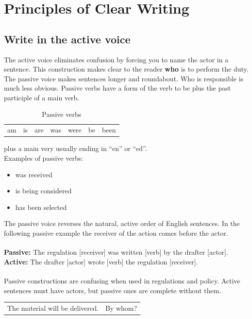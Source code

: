 \documentclass[12pt, letterpaper]{report}
\begin{document}
\begin{linenumbers}
\begin{multicols}{2}
	\end{multicols}
	\chapter{Principles of Clear Writing}
	    \section{Write in the active voice}
	    The active voice eliminates confusion by forcing you to name the actor in a sentence. This construction makes clear to the reader \textbf{who} is to perform the duty.\\
	    The passive voice makes sentences longer and roundabout. Who is responsible is much less obvious. Passive verbs have a form of the verb to be plus the past participle of a main verb.
	    \begin{table}[h]
	        \centering
	        \begin{tabular}{ccccccc}
	             am & is & are & was & were & be & been  \\
	            \end{tabular}
	        \caption{Passive verbs}
	        \label{tab:passverbs}
	    \end{table}
	    plus a main very usually ending in ``en'' or ``ed''.\\
	    Examples of passive verbs:
	    \begin{itemize}
	        \item was received
	        \item is being considered
	        \item has been selected
	    \end{itemize}
	    The passive voice reverses the natural, active order of English sentences. In the following passive example the receiver of the action comes before the actor.\\\\
        \textbf{Passive: }The regulation [receiver] was written [verb] by the drafter [actor].\\
        \textbf{Active: }The drafter [actor] wrote [verb] the regulation [receiver].\\\\
        Passive constructions are confusing when used in regulations and policy. Active sentences must have actors, but passive ones are complete without them.\\
        \begin{tabular}{c|c}
            The material will be delivered. &  By whom?\\

\end{tabular}
\end{linenumbers}
\end{document}
